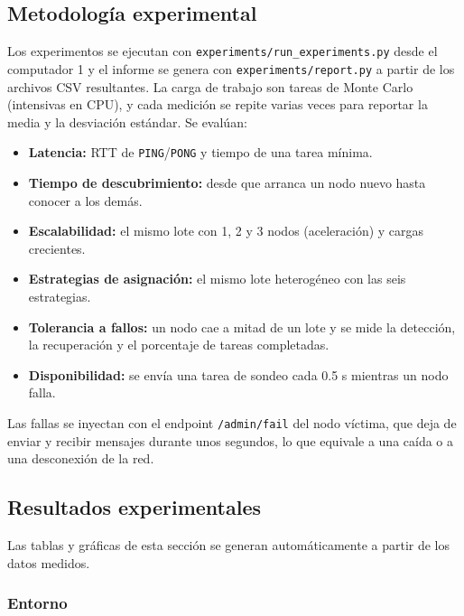 \documentclass{article}
\begin{document}
\subsection{Metodología experimental}

Los experimentos se ejecutan con \texttt{experiments/run\_experiments.py} desde el computador 1 y el
informe se genera con \texttt{experiments/report.py} a partir de los archivos CSV resultantes. La carga
de trabajo son tareas de Monte Carlo (intensivas en CPU), y cada medición se repite varias veces para
reportar la media y la desviación estándar. Se evalúan:

\begin{itemize}
\item \textbf{Latencia:} RTT de \texttt{PING}/\texttt{PONG} y tiempo de una tarea mínima.
\item \textbf{Tiempo de descubrimiento:} desde que arranca un nodo nuevo hasta conocer a los demás.
\item \textbf{Escalabilidad:} el mismo lote con 1, 2 y 3 nodos (aceleración) y cargas crecientes.
\item \textbf{Estrategias de asignación:} el mismo lote heterogéneo con las seis estrategias.
\item \textbf{Tolerancia a fallos:} un nodo cae a mitad de un lote y se mide la detección, la
recuperación y el porcentaje de tareas completadas.
\item \textbf{Disponibilidad:} se envía una tarea de sondeo cada 0.5 s mientras un nodo falla.
\end{itemize}

Las fallas se inyectan con el endpoint \texttt{/admin/fail} del nodo víctima, que deja de enviar y
recibir mensajes durante unos segundos, lo que equivale a una caída o a una desconexión de la red.

\subsection{Resultados experimentales}

Las tablas y gráficas de esta sección se generan automáticamente a partir de los datos medidos.


\subsubsection{Entorno}
\end{document}
